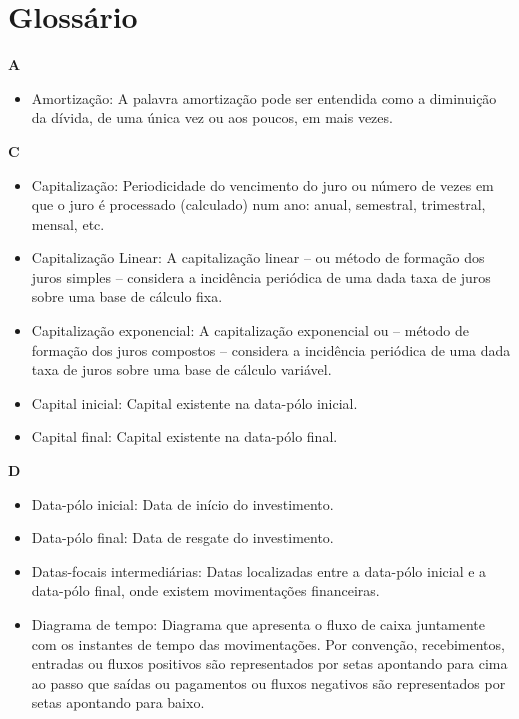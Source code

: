 \chapter{Glossário} \label{glossario}

\textbf{A}

\begin{itemize}
\item Amortização:
    A palavra amortização pode ser entendida como a diminuição da dívida, de uma única vez ou aos poucos, em mais vezes. 
\end{itemize}

\textbf{C}
\begin{itemize}
\item Capitalização: 
    Periodicidade do vencimento do juro ou número de vezes em que o juro é processado (calculado) num ano: anual, semestral, trimestral, mensal, etc. 

\item Capitalização Linear:
    A capitalização linear – ou método de formação dos juros simples – considera a incidência periódica de uma dada taxa de juros sobre uma base de cálculo fixa. 

\item Capitalização exponencial:
    A capitalização exponencial ou – método de formação dos juros compostos – considera a incidência periódica de uma dada taxa de juros sobre uma base de cálculo variável. 

\item Capital inicial:
    Capital existente na data-pólo inicial. 

\item Capital final:
    Capital existente na data-pólo final. 

\end{itemize}

\textbf{D}
\begin{itemize}
 \item Data-pólo inicial:
    Data de início do investimento. 

\item Data-pólo final:
    Data de resgate do investimento. 

\item Datas-focais intermediárias:
    Datas localizadas entre a data-pólo inicial e a data-pólo final, onde existem movimentações financeiras. 

\item Diagrama de tempo:
    Diagrama que apresenta o fluxo de caixa juntamente com os instantes de tempo das movimentações. Por convenção, recebimentos, entradas ou fluxos positivos são representados por setas apontando para cima ao passo que saídas ou pagamentos ou fluxos negativos são representados por setas apontando para baixo. 
\end{itemize}

